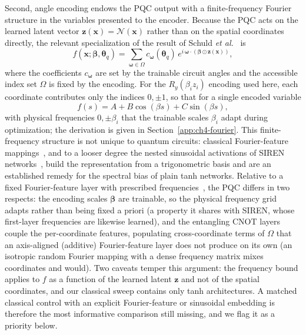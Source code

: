 Second, angle encoding endows the PQC output with a finite-frequency Fourier structure in the variables presented to the encoder. Because the PQC acts on the learned latent vector $\mathbf{z}(\mathbf{x}) = \mathcal{N}(\mathbf{x})$ rather than on the spatial coordinates directly, the relevant specialization of the result of Schuld \emph{et al.}~\cite{schuld2021effect} is
\begin{equation}
    f(\mathbf{x};\boldsymbol{\beta},\boldsymbol{\theta}_q) = \sum_{\boldsymbol{\omega}\in\Omega} c_{\boldsymbol{\omega}}(\boldsymbol{\theta}_q)\, e^{i\,\boldsymbol{\omega}\cdot(\boldsymbol{\beta}\odot\mathbf{z}(\mathbf{x}))},
\end{equation}
where the coefficients $c_{\boldsymbol{\omega}}$ are set by the trainable circuit angles and the accessible index set $\Omega$ is fixed by the encoding. For the $R_y(\beta_i z_i)$ encoding used here, each coordinate contributes only the indices $0,\pm 1$, so that for a single encoded variable
\begin{equation}
    f(s)=A+B\cos(\beta s)+C\sin(\beta s),
\end{equation}
with physical frequencies $0,\pm\beta_i$ that the trainable scales $\beta_i$ adapt during optimization; the derivation is given in Section~\ref{app:ch4-fourier}. This finite-frequency structure is not unique to quantum circuits: classical Fourier-feature mappings~\cite{tancik2020fourier}, and to a looser degree the nested sinusoidal activations of SIREN networks~\cite{sitzmann2020siren}, build the representation from a trigonometric basis and are an established remedy for the spectral bias of plain tanh networks. Relative to a fixed Fourier-feature layer with prescribed frequencies~\cite{tancik2020fourier}, the PQC differs in two respects: the encoding scales $\boldsymbol{\beta}$ are trainable, so the physical frequency grid adapts rather than being fixed a priori (a property it shares with SIREN, whose first-layer frequencies are likewise learned), and the entangling CNOT layers couple the per-coordinate features, populating cross-coordinate terms of $\Omega$ that an axis-aligned (additive) Fourier-feature layer does not produce on its own (an isotropic random Fourier mapping with a dense frequency matrix mixes coordinates and would). Two caveats temper this argument: the frequency bound applies to $f$ as a function of the learned latent $\mathbf{z}$ and not of the spatial coordinates, and our classical sweep contains only tanh architectures. A matched classical control with an explicit Fourier-feature or sinusoidal embedding is therefore the most informative comparison still missing, and we flag it as a priority below.

